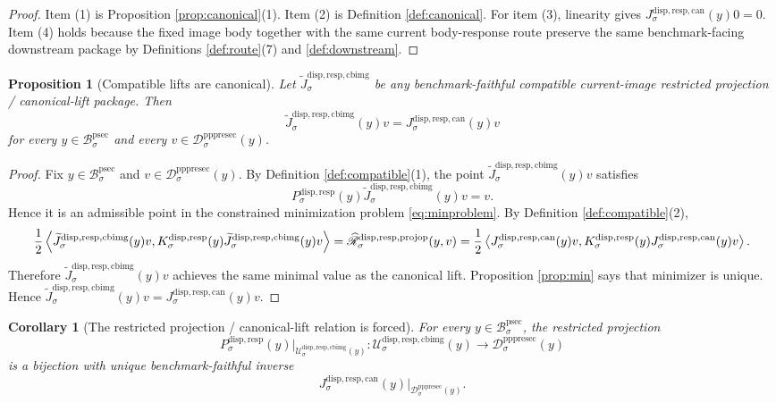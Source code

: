\documentclass[11pt]{article}
\newcommand{\ProtoSectionBody}[1]{\mathcal B_{#1}^{\mathrm{psec}}}
\newcommand{\PrePreProtoSectionResidualBody}[1]{\mathcal D_{#1}^{\mathrm{pppresec}}}
\newcommand{\SubstrateProjection}[1]{P_{#1}^{\mathrm{disp,resp}}}
\newcommand{\SubstrateOperator}[1]{K_{#1}^{\mathrm{disp,resp}}}
\newcommand{\CanonicalLift}[1]{J_{#1}^{\mathrm{disp,resp,can}}}
\newcommand{\CoreForcedBodyResponse}[1]{\widehat{\mathscr R}_{#1}^{\mathrm{disp,resp,projop}}}
\newcommand{\CanonicalImageBody}[1]{\mathcal U_{#1}^{\mathrm{disp,resp,cbimg}}}
\newcommand{\CompatibleImageLift}[1]{\widetilde J_{#1}^{\mathrm{disp,resp,cbimg}}}
\newtheorem{proposition}{Proposition}
\newtheorem{corollary}{Corollary}
\begin{document}
\begin{proof}
Item (1) is Proposition \ref{prop:canonical}(1). Item (2) is Definition \ref{def:canonical}. For item (3), linearity gives \(\CanonicalLift{\sigma}(y)0=0\). Item (4) holds because the fixed image body together with the same current body-response route preserve the same benchmark-facing downstream package by Definitions \ref{def:route}(7) and \ref{def:downstream}.
\end{proof}

\begin{proposition}[Compatible lifts are canonical]
\label{prop:lift}
Let \(\CompatibleImageLift{\sigma}\) be any benchmark-faithful compatible current-image restricted projection / canonical-lift package. Then
\[
\CompatibleImageLift{\sigma}(y)v
=
\CanonicalLift{\sigma}(y)v
\]
for every \(y\in\ProtoSectionBody{\sigma}\) and every \(v\in\PrePreProtoSectionResidualBody{\sigma}(y)\).
\end{proposition}

\begin{proof}
Fix \(y\in\ProtoSectionBody{\sigma}\) and \(v\in\PrePreProtoSectionResidualBody{\sigma}(y)\). By Definition \ref{def:compatible}(1), the point \(\CompatibleImageLift{\sigma}(y)v\) satisfies
\[
\SubstrateProjection{\sigma}(y)\CompatibleImageLift{\sigma}(y)v=v.
\]
Hence it is an admissible point in the constrained minimization problem \eqref{eq:minproblem}. By Definition \ref{def:compatible}(2),
\[
\frac{1}{2}
\ev{
\CompatibleImageLift{\sigma}(y)v,
\SubstrateOperator{\sigma}(y)\CompatibleImageLift{\sigma}(y)v
}
=
\CoreForcedBodyResponse{\sigma}(y,v)
=
\frac{1}{2}
\ev{
\CanonicalLift{\sigma}(y)v,
\SubstrateOperator{\sigma}(y)\CanonicalLift{\sigma}(y)v
}.
\]
Therefore \(\CompatibleImageLift{\sigma}(y)v\) achieves the same minimal value as the canonical lift. Proposition \ref{prop:min} says that minimizer is unique. Hence \(\CompatibleImageLift{\sigma}(y)v=\CanonicalLift{\sigma}(y)v\).
\end{proof}

\begin{corollary}[The restricted projection / canonical-lift relation is forced]
\label{cor:relation}
For every \(y\in\ProtoSectionBody{\sigma}\), the restricted projection
\[
\SubstrateProjection{\sigma}(y)\big|_{\CanonicalImageBody{\sigma}(y)}
:
\CanonicalImageBody{\sigma}(y)\to\PrePreProtoSectionResidualBody{\sigma}(y)
\]
is a bijection with unique benchmark-faithful inverse
\[
\CanonicalLift{\sigma}(y)\big|_{\PrePreProtoSectionResidualBody{\sigma}(y)}.
\]
\end{corollary}
\end{document}
